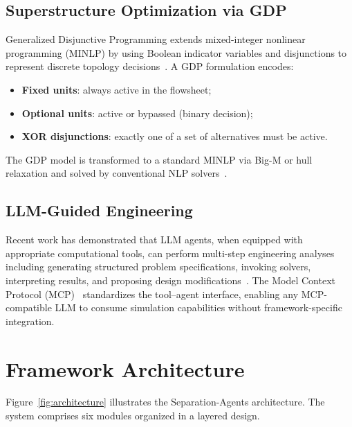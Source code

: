 \documentclass[11pt]{article}
\begin{document}
\subsection{Superstructure Optimization via GDP}

Generalized Disjunctive Programming extends mixed-integer nonlinear
programming (MINLP) by using Boolean indicator variables and disjunctions
to represent discrete topology decisions~\citep{grossmann2002review}.
A GDP formulation encodes:
\begin{itemize}
  \item \textbf{Fixed units}: always active in the flowsheet;
  \item \textbf{Optional units}: active or bypassed (binary decision);
  \item \textbf{XOR disjunctions}: exactly one of a set of alternatives
    must be active.
\end{itemize}
The GDP model is transformed to a standard MINLP via Big-M or hull
relaxation and solved by conventional NLP solvers~\citep{chen2022pyomo}.

\subsection{LLM-Guided Engineering}

Recent work has demonstrated that LLM agents, when equipped with
appropriate computational tools, can perform multi-step engineering
analyses including generating structured problem specifications,
invoking solvers, interpreting results, and proposing design
modifications~\citep{kang2024quantitative}.  The Model Context Protocol
(MCP)~\citep{anthropic2024mcp} standardizes the tool--agent interface,
enabling any MCP-compatible LLM to consume simulation capabilities without
framework-specific integration.


\section{Framework Architecture}\label{sec:architecture}

Figure~\ref{fig:architecture} illustrates the Separation-Agents
architecture.  The system comprises six modules organized in a layered
design.
\end{document}
